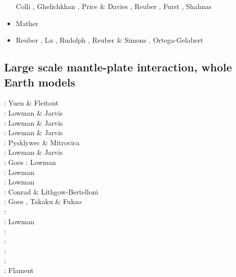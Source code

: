 \begin{scriptsize}
\begin{itemize}
                            Colli \etal \cite{cogb18}, Ghelichkhan \etal \cite{ghmc18},
                            Price \& Davies \cite{prda18}, Reuber \etal \cite{repk18},
                            Furst \etal \cite{fupc18}, Shahnas \etal \cite{shyp18}
\item[\twothousandnineteen] Mather \etal \cite{mamr19} 
\item[\twothousandtwenty] Reuber \etal \cite{rehp20}, Lu \etal{} \cite{lufs20},
                          Rudolph \etal \cite{ruml20}, Reuber \& Simons \cite{resi20},
                          Ortega-Gelabert \etal \cite{orza20}
\end{itemize}
\end{scriptsize}

\subsection{Large scale mantle-plate interaction, whole Earth models}

\begin{scriptsize}
\nineteeneightyfive: Yuen \& Fleitout \cite{yufl85}\\
\nineteenninetythree: Lowman \& Jarvis \cite{loja93}\\
\nineteenninetyfive: Lowman \& Jarvis \cite{loja95}\\
\nineteenninetysix: Lowman \& Jarvis \cite{loja96}\\
\nineteenninetyeight: Pysklywec \& Mitrovica \cite{pymi98}\\
\nineteenninetynine: Lowman \& Jarvis \cite{loja99}\\
\twothousand: Goes \etal \cite{golw00}
\twothousandone: Lowman \etal \cite{lokg01} \\
\twothousandthree: Lowman \etal \cite{lokg03} \\
\twothousandfour: Lowman \etal \cite{lokg04} \\
\twothousandsix: Conrad \& Lithgow-Bertelloni \cite{coli06}\\
\twothousandeight: Goes \etal \cite{gocm08}, Takaku \& Fukao \cite{tafu08}\\
\twothousandten: \cite{wamg10}\cite{stgb10}\cite{cobe10}\\
\twothousandeleven: Lowman \etal \cite{lokt11}\\
\twothousandtwelve: \cite{algs12}\cite{roct12}\cite{crtm12}\\
\twothousandthirteen: \cite{ghbh13}\cite{yahb13}\\
\twothousandsixteen: \cite{macs16}\\
\twothousandeighteen: \cite{hulz18}\cite{osss18b}\\
\twothousandnineteen: Flament \cite{flam19}
\end{scriptsize}

